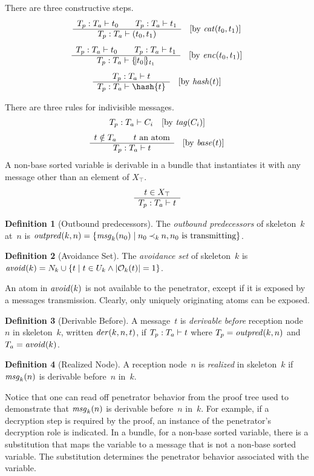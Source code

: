 \documentclass[12pt]{report}
\theoremstyle{definition}
\newtheorem{defn}{Definition}[chapter]
\newcommand{\outpred}{\fn{outpred}}
\newcommand{\avoid}{\fn{avoid}}
\newcommand{\msg}{\fn{msg}}
\begin{document}
There are three constructive steps.
$$\infer{\der{t_0}{T_p}{T_a}\qquad\der{t_1}{T_p}{T_a}}%
{\der{(t_0,t_1)}{T_p}{T_a}}\quad
[\mbox{by $\fn{cat}(t_0,t_1)$}]$$
$$\infer{\der{t_0}{T_p}{T_a}\qquad\der{t_1}{T_p}{T_a}}%
{\der{\enc{t_0}{t_1}}{T_p}{T_a}}\quad
[\mbox{by $\fn{enc}(t_0,t_1)$}]$$
$$\infer{\der{t}{T_p}{T_a}}%
{\der{\hash{t}}{T_p}{T_a}}\quad
[\mbox{by $\fn{hash}(t)$}]$$

There are three rules for indivisible messages.
$$\der{C_i}{T_p}{T_a}\quad
[\mbox{by $\fn{tag}(C_i)$}]$$
$$\infer{t\notin T_a\qquad\mbox{$t$ an atom}}%
{\der{t}{T_p}{T_a}}\quad
[\mbox{by $\fn{base}(t)$}]$$
A non-base sorted variable is derivable in a bundle that instantiates
it with any message other than an element of $X_\top$.
$$\infer{t\in X_\top}{\der{t}{T_p}{T_a}}$$

\begin{defn}[Outbound predecessors]
The \emph{outbound predecessors} of
skeleton~$k$ at~$n$ is $\outpred(k,n)=\{\msg_k(n_0)\mid n_0 \kprec{k}
n, n_0\mbox{~is transmitting}\}$.
\end{defn}

\begin{defn}[Avoidance Set]\label{def:avoid}
The \emph{avoidance set} of skeleton~$k$ is
$\avoid(k)=N_k\cup\{t\mid t\in U_k\land|\orig_k(t)|=1\}$.
\end{defn}

An atom in $\avoid(k)$ is not available to the penetrator, except
if it is exposed by a messages transmission.  Clearly, only uniquely
originating atoms can be exposed.

\begin{defn}[Derivable Before]\label{def:der}
A message~$t$ is \emph{derivable before}
reception node~$n$ in skeleton~$k$, written $\fn{der}(k,n,t)$, if
$\der{t}{T_p}{T_a}$ where $T_p=\outpred(k,n)$ and $T_a=\avoid(k)$.
\end{defn}

\begin{defn}[Realized Node]
A reception node~$n$ is \emph{realized} in skeleton~$k$ if
$\msg_k(n)$ is derivable before~$n$ in~$k$.
\end{defn}

Notice that one can read off penetrator behavior from the proof tree
used to demonstrate that $\msg_k(n)$ is derivable before~$n$
in~$k$.  For example, if a decryption step is required by the proof,
an instance of the penetrator's decryption role is indicated.  In a
bundle, for a non-base sorted variable, there is a substitution that
maps the variable to a message that is not a non-base sorted variable.
The substitution determines the penetrator behavior associated with
the variable.
\end{document}
